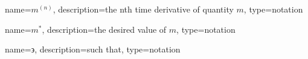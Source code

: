 	\newcommand{\tdern}[2]{\ensuremath{{#1}^{(#2)}}}
	{%
		name=\tdern{m}{n},
		description=the nth time derivative of quantity $m$,
		type=notation
	}

	\newcommand{\desired}[1]{\ensuremath{{#1}^{*}}}
	{%
		name=\desired{m},
		description=the desired value of $m$,
		type=notation
	}

	{%
		name={\ensuremath{\backepsilon}},
		description=such that,
		type=notation
	}
	\newcommand{\suchthat}{\gls{not:suchthat}}
